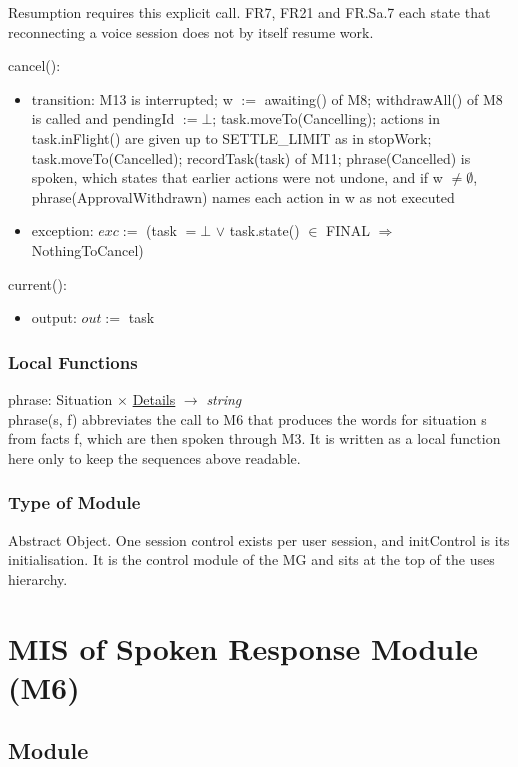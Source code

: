 \documentclass[12pt, titlepage]{article}
\newcommand{\str}{\textit{string}}
\newcommand{\nil}{\bot}
\begin{document}
\noindent Resumption requires this explicit call. FR7, FR21 and FR.Sa.7 each
state that reconnecting a voice session does not by itself resume work.

\noindent cancel():
\begin{itemize}
\item transition: M13 is interrupted; w $:=$ awaiting() of M8; withdrawAll() of
M8 is called and pendingId $:= \nil$; task.moveTo(Cancelling); actions in task.inFlight() are
given up to SETTLE\_LIMIT as in stopWork; task.moveTo(Cancelled);
recordTask(task) of M11; phrase(Cancelled) is spoken, which states that earlier
actions were not undone, and if w $\neq \emptyset$, phrase(ApprovalWithdrawn)
names each action in w as not executed
\item exception: $exc :=$ (task $= \nil$ $\vee$ task.state() $\in$ FINAL
$\Rightarrow$ NothingToCancel)
\end{itemize}

\noindent current():
\begin{itemize}
\item output: $out :=$ task
\end{itemize}

\subsubsection{Local Functions}

\noindent phrase: Situation $\times$ \hyperref[type:Details]{Details} $\to$
\str\\
phrase(s, f) abbreviates the call to M6 that produces the words for situation s
from facts f, which are then spoken through M3. It is written as a local
function here only to keep the sequences above readable.

\subsubsection{Type of Module}

Abstract Object. One session control exists per user session, and initControl is
its initialisation. It is the control module of the MG and sits at the top of
the uses hierarchy.

\newpage

\section{MIS of Spoken Response Module (M6)} \label{mod:response}

\subsection{Module}
\end{document}
